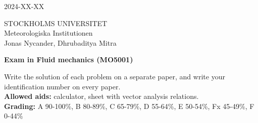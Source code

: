 \documentclass[12pt,a4paper]{article}
\begin{document}
\begin{center}
2024-XX-XX
\end{center}
STOCKHOLMS UNIVERSITET\\
Meteorologiska Institutionen\\
Jonas Nycander, Dhrubaditya Mitra\\
\vspace{1cm}

\begin{center}
{\bf\large Exam in Fluid mechanics (MO5001)}\\
\end{center}

Write the solution of each problem on a separate paper, and write your identification number on every paper.\\

{\bf Allowed aids:} calculator, sheet with vector analysis relations.\\

{\bf Grading:} A 90-100\%, B 80-89\%, C 65-79\%, D 55-64\%, E 50-54\%, Fx 45-49\%, F 0-44\% \\
\vspace{0.5cm}
\end{document}
